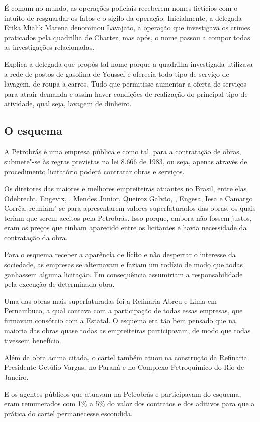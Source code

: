 É comum no mundo, as operações policiais receberem nomes fictícios com o
intuito de resguardar os fatos e o sigilo da operação. Inicialmente, a
delegada Erika Mialik Marena denominou Lavajato, a operação que
investigava os crimes praticados pela quadrilha de Charter, mas após, o
nome passou a compor todas as investigações relacionadas.

Explica a delegada que propôs tal nome porque a quadrilha investigada
utilizava a rede de postos de gasolina de Youssef e oferecia todo tipo
de serviço de lavagem, de roupa a carros. Tudo que permitisse aumentar a
oferta de serviços para atrair demanda e assim haver condições de
realização do principal tipo de atividade, qual seja, lavagem de
dinheiro.

\subsection{O esquema}

A Petrobrás é uma empresa pública e como tal, para a contratação de
obras, submete"-se às regras previstas na lei 8.666 de 1983, ou seja,
apenas através de procedimento licitatório poderá contratar obras e
serviços.

Os diretores das maiores e melhores empreiteiras atuantes no Brasil,
entre elas Odebrecht, Engevix, , Mendes Junior, Queiroz Galvão, ,
Engesa, Iesa e Camargo Corrêa, reuniam"-se para apresentarem valores
superfaturados das obras, os quais teriam que serem aceitos pela
Petrobrás. Isso porque, embora não fossem justos, eram os preços que
tinham aparecido entre os licitantes e havia necessidade da contratação
da obra.

Para o esquema receber a aparência de lícito e não despertar o interesse
da sociedade, as empresas se alternavam e faziam um rodízio de modo que
todas ganhassem alguma licitação. Em consequência assumiriam a
responsabilidade pela execução de determinada obra.

Uma das obras mais superfaturadas foi a Refinaria Abreu e Lima em
Pernambuco, a qual contava com a participação de todas essas empresas,
que firmavam consórcio com a Estatal. O esquema era tão bem pensado que
na maioria das obras quase todas as empreiteiras participavam, de modo
que todas tivessem benefício.

Além da obra acima citada, o cartel também atuou na construção da
Refinaria Presidente Getúlio Vargas, no Paraná e no Complexo
Petroquímico do Rio de Janeiro.

E os agentes públicos que atuavam na Petrobrás e participavam do
esquema, eram remunerados com 1\% a 5\% do valor dos contratos e dos
aditivos para que a prática do cartel permanecesse escondida.

